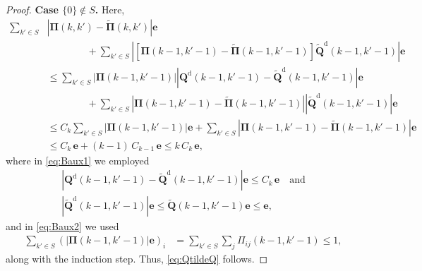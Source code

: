 \documentclass[11pt,leqno]{amsart}
\numberwithin{table}{section}
\numberwithin{figure}{section}
\numberwithin{equation}{section}
\newcommand{\1}{{\mathds{1}}}
\newcommand{\0}{\mat{0}}
\newcommand{\tld}[1]{\widetilde{#1}}
\begin{document}
{\begin{proof}
\textbf{Case $\{0\}\notin S$.} Here,
\begin{align}
\sum_{k'\in S}&\left|{\bm{\Pi}}(k,k')-\tld{\bm{\Pi}}(k,k')\right|\bm{e}\nonumber\\
&\qquad\qquad + \sum_{k'\in S}\left| \left[{\bm{\Pi}}(k-1,k'-1)-\tld{\bm{\Pi}}(k-1,k'-1)\right]\tld{\bm{Q}}^{\mathrm{d}}(k-1,k'-1)\right|\bm{e}\nonumber\\
&\le\sum_{k'\in S}\left|  {\bm{\Pi}}(k-1,k'-1)\right| \left|{\bm{Q}}^{\mathrm{d}}(k-1,k'-1)-\tld{\bm{Q}}^{\mathrm{d}}(k-1,k'-1)\right|\bm{e}\nonumber\\
&\qquad\qquad + \sum_{k'\in S}\left| {\bm{\Pi}}(k-1,k'-1)-\tld{\bm{\Pi}}(k-1,k'-1)\right|\left|\tld{\bm{Q}}^{\mathrm{d}}(k-1,k'-1)\right|\bm{e}\nonumber\\
&\le C_{k}\sum_{k'\in S}\left|  {\bm{\Pi}}(k-1,k'-1)\right|\bm{e} + \sum_{k'\in S}\left| {\bm{\Pi}}(k-1,k'-1)-\tld{\bm{\Pi}}(k-1,k'-1)\right|\bm{e}\label{eq:Baux1}\\
&\le C_{k}\,\bm{e} + (k-1)\,C_{k-1}\,\bm{e}\le k\,C_k\,\bm{e},\label{eq:Baux2}
\end{align}
where in \eqref{eq:Baux1} we employed 
\[\begin{gathered}
|{\bm{Q}}^{\mathrm{d}}(k-1,k'-1) - \tld{\bm{Q}}^{\mathrm{d}}(k-1,k'-1)|\bm{e}\le C_{k}\,\bm{e}\quad\mbox{and}\\
 |\tld{\bm{Q}}^{\mathrm{d}}(k-1,k'-1)|\bm{e}\le\tld{\bm{Q}}(k-1,k'-1) \bm{e}\le \bm{e},
 \end{gathered}\]
  and in \eqref{eq:Baux2} we used
\begin{align*}
\sum_{k'\in S}(\left|{\bm{\Pi}}(k-1,k'-1)\right|\bm{e})_i& = \sum_{k'\in S}\sum_{j}\Pi_{ij}(k-1,k'-1) \le 1,
\end{align*}
along with the induction step. Thus, \eqref{eq:QtildeQ} follows.


\end{proof}}
\end{document}
